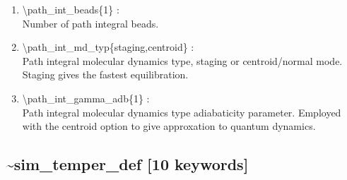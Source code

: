 \documentclass[12pt,titlepage]{article}
\begin{document}
\begin{enumerate}

 \vspace{0.15in} 
 \item  \textbackslash path\_int\_beads\{1\} : \\
     Number of path integral beads.

 \vspace{0.15in} 
 \item  \textbackslash path\_int\_md\_typ\{staging,centroid\} : \\
     Path integral molecular dynamics type, staging or centroid/normal mode.
     Staging gives the fastest equilibration.

 \vspace{0.15in} 
 \item  \textbackslash path\_int\_gamma\_adb\{1\} : \\
     Path integral molecular dynamics type adiabaticity parameter.
     Employed with the centroid option to give approxation to quantum dynamics.




\end{enumerate}

\newpage
\newpage
\subsection*{\bf \~{}sim\_temper\_def [10 keywords]}
\end{document}
